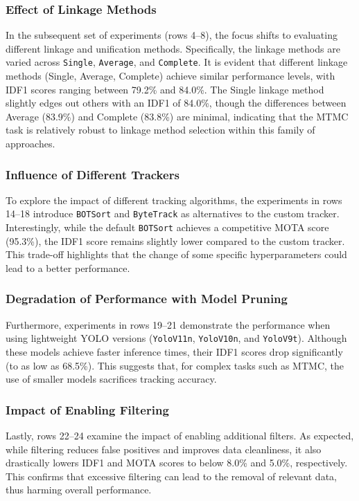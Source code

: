 \subsubsection{Effect of Linkage Methods}
In the subsequent set of experiments (rows 4--8), the focus shifts to evaluating different linkage and unification methods. Specifically, the linkage methods are varied across \texttt{Single}, \texttt{Average}, and \texttt{Complete}. It is evident that different linkage methods (Single, Average, Complete) achieve similar performance levels, with IDF1 scores ranging between 79.2\% and 84.0\%. The Single linkage method slightly edges out others with an IDF1 of 84.0\%, though the differences between Average (83.9\%) and Complete (83.8\%) are minimal, indicating that the MTMC task is relatively robust to linkage method selection within this family of approaches.

\subsubsection{Influence of Different Trackers}
To explore the impact of different tracking algorithms, the experiments in rows 14--18 introduce \texttt{BOTSort} and \texttt{ByteTrack} as alternatives to the custom tracker. Interestingly, while the default \texttt{BOTSort} achieves a competitive MOTA score (95.3\%), the IDF1 score remains slightly lower compared to the custom tracker. This trade-off highlights that the change of some specific hyperparameters could lead to a better performance.

\subsubsection{Degradation of Performance with Model Pruning}
Furthermore, experiments in rows 19--21 demonstrate the performance when using lightweight YOLO versions (\texttt{YoloV11n}, \texttt{YoloV10n}, and \texttt{YoloV9t}). Although these models achieve faster inference times, their IDF1 scores drop significantly (to as low as 68.5\%). This suggests that, for complex tasks such as MTMC, the use of smaller models sacrifices tracking accuracy.

\subsubsection{Impact of Enabling Filtering}
Lastly, rows 22--24 examine the impact of enabling additional filters. As expected, while filtering reduces false positives and improves data cleanliness, it also drastically lowers IDF1 and MOTA scores to below 8.0\% and 5.0\%, respectively. This confirms that excessive filtering can lead to the removal of relevant data, thus harming overall performance.

